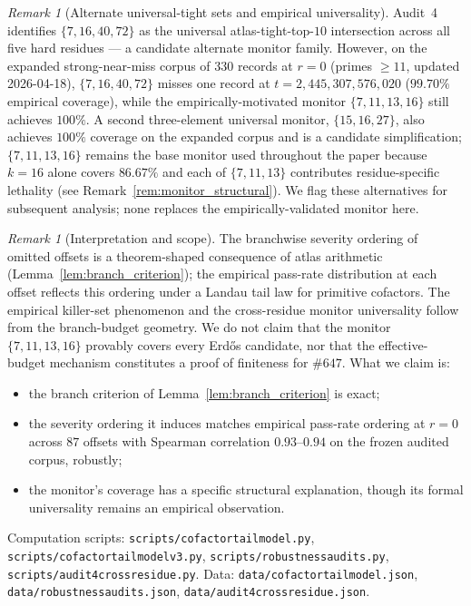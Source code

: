 \documentclass[11pt]{article}
\renewcommand{\_}{\origunderscore\allowbreak}
\theoremstyle{definition}
\theoremstyle{remark}
\newtheorem{remark}[theorem]{Remark}
\begin{document}
\begin{remark}[Alternate universal-tight sets and empirical universality]\label{rem:alt_monitor}
Audit~4 identifies $\{7,16,40,72\}$ as the universal atlas-tight-top-$10$
intersection across all five hard residues — a candidate alternate
monitor family.  However, on the expanded strong-near-miss corpus
of $330$ records at $r=0$ (primes $\ge 11$, updated 2026-04-18),
$\{7,16,40,72\}$ misses one record at $t=2{,}445{,}307{,}576{,}020$
($99.70\%$ empirical coverage), while the empirically-motivated
monitor $\{7,11,13,16\}$ still achieves $100\%$.  A second
three-element universal monitor, $\{15,16,27\}$, also achieves
$100\%$ coverage on the expanded corpus and is a candidate
simplification; $\{7,11,13,16\}$ remains the base monitor used
throughout the paper because $k=16$ alone covers $86.67\%$ and
each of $\{7,11,13\}$ contributes residue-specific lethality
(see Remark~\ref{rem:monitor_structural}).  We flag these
alternatives for subsequent analysis; none replaces the
empirically-validated monitor here.
\end{remark}

\begin{remark}[Interpretation and scope]\label{rem:beff_interpretation}
The branchwise severity ordering of omitted offsets is a
theorem-shaped consequence of atlas arithmetic
(Lemma~\ref{lem:branch_criterion}); the empirical pass-rate
distribution at each offset reflects this ordering under a Landau
tail law for primitive cofactors. The empirical killer-set
phenomenon and the cross-residue monitor universality follow from
the branch-budget geometry. We do not claim that the monitor
$\{7,11,13,16\}$ provably covers every Erd\H{o}s candidate, nor
that the effective-budget mechanism constitutes a proof of
finiteness for $\#647$. What we claim is:
\begin{itemize}
\item the branch criterion of Lemma~\ref{lem:branch_criterion} is
exact;
\item the severity ordering it induces matches empirical pass-rate
ordering at $r=0$ across $87$ offsets with Spearman correlation
$0.93$--$0.94$ on the frozen audited corpus, robustly;
\item the monitor's coverage has a specific structural
explanation, though its formal universality remains an empirical
observation.
\end{itemize}
Computation scripts: \texttt{scripts/cofactor\_tail\_model.py},
\texttt{scripts/cofactor\_tail\_model\_v3.py},
\texttt{scripts/robustness\_audits.py},
\texttt{scripts/audit4\_cross\_residue.py}.
Data: \texttt{data/cofactor\_tail\_model.json},
\texttt{data/robustness\_audits.json},
\texttt{data/audit4\_cross\_residue.json}.
\end{remark}
\end{document}
